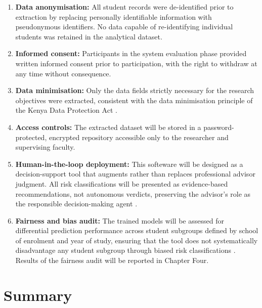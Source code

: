 \documentclass[12pt]{report}
\begin{document}
\begin{enumerate}
    \item \textbf{Data anonymisation:} All student records were de-identified
    prior to extraction by replacing personally identifiable information with
    pseudonymous identifiers. No data capable of re-identifying individual
    students was retained in the analytical dataset.

    \item \textbf{Informed consent:} Participants in the system evaluation
    phase provided written informed consent prior to participation, with the
    right to withdraw at any time without consequence.

    \item \textbf{Data minimisation:} Only the data fields strictly necessary
    for the research objectives were extracted, consistent with the data
    minimisation principle of the Kenya Data Protection Act \parencite{kenya2019dataprotection}.

    \item \textbf{Access controls:} The extracted dataset will be stored in a
    password-protected, encrypted repository accessible only to the researcher
    and supervising faculty.

    \item \textbf{Human-in-the-loop deployment:} This softeware will be designed
    as a decision-support tool that augments rather than replaces professional
    advisor judgment. All risk classifications will be presented as
    evidence-based recommendations, not autonomous verdicts, preserving the
    advisor's role as the responsible decision-making agent \parencite{kwakye2025}.

    \item \textbf{Fairness and bias audit:} The trained models will be assessed
    for differential prediction performance across student subgroups defined
    by school of enrolment and year of study, ensuring that the tool does not 
    systematically disadvantage any student subgroup through biased
    risk classifications \parencite{bello2025developing, kwakye2025}.
    Results of the fairness audit will be reported in Chapter Four.
\end{enumerate}

\section{Summary}
\end{document}
